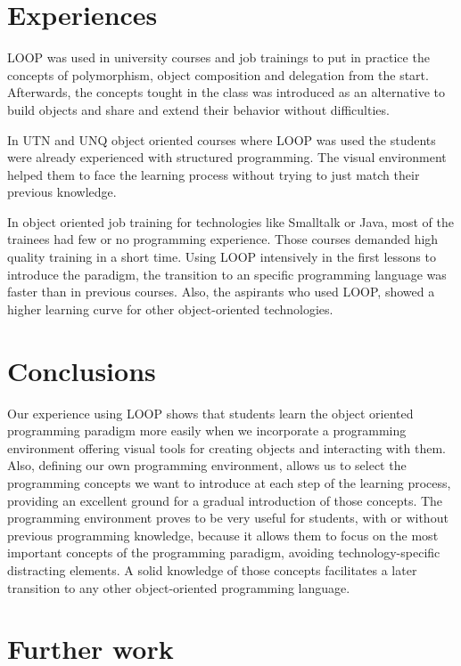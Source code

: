 \documentclass{sigplanconf}
\begin{document}
\section{Experiences}

LOOP was used in university courses and job trainings to put in practice the concepts of polymorphism, object composition and delegation from the start.  Afterwards, the concepts tought in the class was introduced as an alternative to build objects and share and extend their behavior without difficulties.

\bigskip
In UTN and UNQ object oriented courses where LOOP was used the students were already experienced with structured programming.  The visual environment helped them to face the learning process without trying to just match their previous knowledge.

In object oriented job training for technologies like Smalltalk or Java, most of the trainees had few or no programming experience. Those courses demanded high quality training in a short time. Using LOOP intensively in the first lessons to introduce the paradigm, the transition to an specific programming language was faster than in previous courses. Also, the aspirants who used LOOP, showed a higher learning curve for other object-oriented technologies.

\section{Conclusions}

Our experience using LOOP shows that students learn the object oriented programming paradigm more easily when we incorporate a programming environment offering visual tools for creating objects and interacting with them. Also, defining our own programming environment, allows us to select the programming concepts we want to introduce at each step of the learning process, providing an excellent ground for a gradual introduction of those concepts. The programming environment proves to be very useful for students, with or without previous programming knowledge, because it allows them to focus on the most important concepts of the programming paradigm, avoiding technology-specific distracting elements. A solid knowledge of those concepts facilitates a later transition to any other object-oriented programming language.

\section{Further work}
\end{document}
